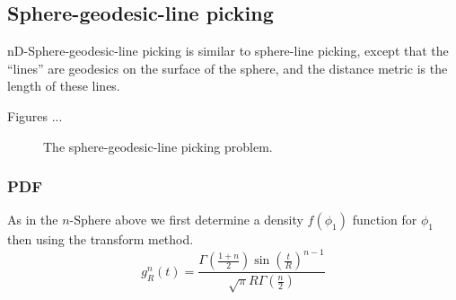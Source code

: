 \subsection{Sphere-geodesic-line picking}
\label{sec:sphere_geodesic_line}


nD-Sphere-geodesic-line picking is similar to sphere-line picking, except
that the ``lines'' are geodesics on the surface of the sphere, and the
distance metric is the length of these lines.

Figures ...

\begin{figure}[tbp]
  \begin{center}
    \hspace{6mm}
    \caption{The sphere-geodesic-line picking problem.}
  \end{center} 
\vspace{-4mm}
\end{figure}

\subsubsection{PDF}

As in the $n$-Sphere above we first determine a density $f(\phi_1)$ function for $\phi_1$ then using the transform method.
\begin{equation}
g_{R}^{n}(t)=\frac{\Gamma\left(\frac{1+n}{2}\right) \sin\left(\frac{t}{R}\right)^{n-1}}{\sqrt{\pi } R \Gamma\left(\frac{n}{2}\right)}
\end{equation}

